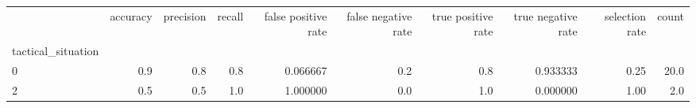 \begin{tabular}{lrrrrrrrrr}
\toprule
{} &  accuracy &  precision &  recall &  false positive rate &  false negative rate &  true positive rate &  true negative rate &  selection rate &  count \\
tactical\_situation &           &            &         &                      &                      &                     &                     &                 &        \\
\midrule
0                  &       0.9 &        0.8 &     0.8 &             0.066667 &                  0.2 &                 0.8 &            0.933333 &            0.25 &   20.0 \\
2                  &       0.5 &        0.5 &     1.0 &             1.000000 &                  0.0 &                 1.0 &            0.000000 &            1.00 &    2.0 \\
\bottomrule
\end{tabular}
